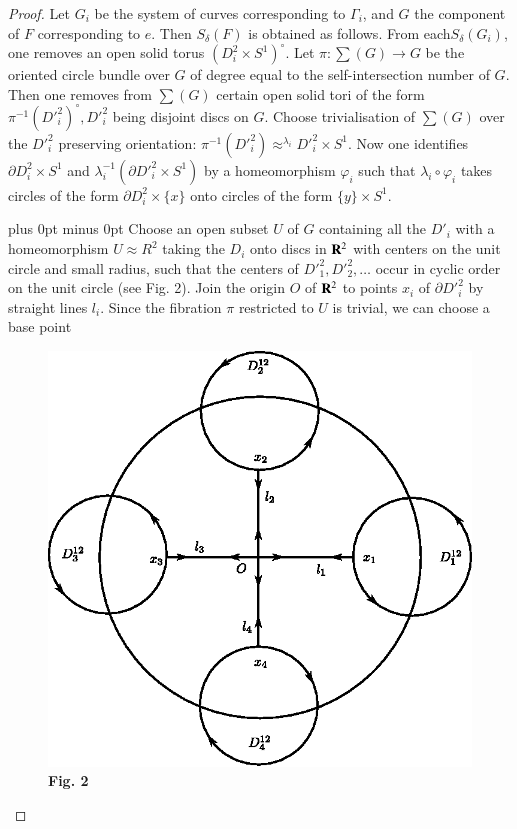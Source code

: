 \begin{proof}
Let $G_i$ be the system of curves corresponding to $\Gamma_i$, and $G$ the component of $F$ corresponding to $e$. Then $S_\delta (F)$ is obtained as follows. From each\pageoriginale $S_\delta (G_i)$, one removes an open solid torus $(D^2_i \times S^1)^\circ$. Let $\pi: \sum (G) \to G$ be the oriented circle bundle over $G$ of degree equal to the self-intersection number of $G$. Then one removes from $\sum (G)$ certain open solid tori of the form $\pi^{-1} (D'^2_i)^\circ, D'^2_i$ being disjoint discs on $G$. Choose trivialisation of $\sum (G)$ over the $D'^2_i$ preserving orientation: $\pi^{-1} (D'^2_i) \displaystyle\mathop\approx^{\lambda_i} D'^2_i \times S^1$. Now one identifies $\partial D^2_i \times S^1$ and $\lambda^{-1}_i (\partial D'^2_i \times S^1)$ by a homeomorphism $\varphi_i$ such that $\lambda_i \circ \varphi_i$ takes circles of the form $\partial D^2_i \times \{ x\}$ onto circles of the form $\{y\} \times S^1$.

{ \parfillskip 0pt plus 0pt minus 0pt
Choose an open subset $U$ of $G$ containing all the $D'_i$ with a homeomorphism $U \approx R^2$ taking the $D_i$ onto discs in $\mathbf{R}^2$  with centers on the unit circle and small radius, such that the centers of $D'^2_1, D'^2_2, \ldots$ occur in cyclic order on the unit circle (see Fig. 2). Join the origin $O$ of $\mathbf{R}^2$ to points $x_i$ of $\partial D'^2_i$ by straight lines $l_i$. Since the fibration $\pi$ restricted to $U$ is trivial, we can choose a base point\par}


\begin{figure}[H]
\centering
\includegraphics{fig3.eps}\\
{\bf Fig. 2}
\end{figure}


\end{proof}
